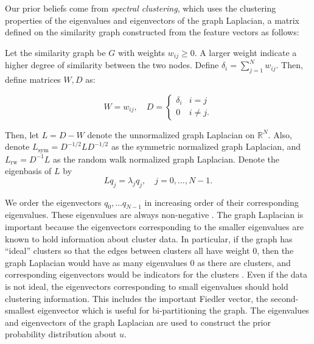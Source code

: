 \documentclass{siamart1116}
\begin{document}
Our prior beliefs come from \textit{spectral clustering}, which uses the clustering properties of the eigenvalues and eigenvectors of the graph Laplacian, a matrix defined on the similarity graph constructed from the feature vectors as follows:

Let the similarity graph be $G$ with weights $w_{ij} \ge 0$. A larger weight indicate a higher degree of similarity between the two nodes. Define $\delta_i = \sum_{j=1}^N w_{ij}$. Then, define matrices $W, D$ as:

\[W = w_{ij},\quad D = \begin{cases} 
\delta_i    & i = j \\
0           & i \neq j. 
\end{cases}\]

Then, let $L = D - W$ denote the unnormalized graph Laplacian on $\mathbb{R}^N$. Also, denote $L_\text{sym} = D^{-1/2}LD^{-1/2}$ as the symmetric normalized graph Laplacian, and $L_\text{rw}=D^{-1}L$ as the random walk normalized graph Laplacian. Denote the eigenbasis of $L$ by
\begin{equation}
\label{eqn:laplacian}
Lq_j = \lambda_j q_j,\quad j=0,\ldots,N-1.
\end{equation}

We order the eigenvectors $q_0, \ldots q_{N-1}$ in increasing order of their corresponding eigenvalues. These eigenvalues are always non-negative \cite{Spectral}. The graph Laplacian is important because the eigenvectors corresponding to the smaller eigenvalues are known to hold information about cluster data. In particular, if the graph has ``ideal'' clusters so that the edges between clusters all have weight 0, then the graph Laplacian would have as many eigenvalues 0 as there are clusters, and corresponding eigenvectors would be indicators for the clusters \cite{Spectral}. Even if the data is not ideal, the eigenvectors corresponding to small eigenvalues should hold clustering information. This includes the important Fiedler vector, the second-smallest eigenvector which is useful for bi-partitioning the graph. The eigenvalues and eigenvectors of the graph Laplacian are used to construct the prior probability distribution about $u$.

\end{document}

